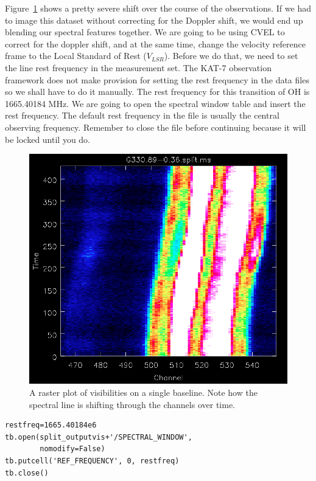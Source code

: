 \documentclass[force,almostfull,justified]{tufte-book}
\begin{document}

Figure~\ref{fig:doppler} shows a pretty severe shift over the course of the observations.  If we had
to image this dataset without correcting for the Doppler shift, we would end up blending our spectral
features together. We are going to be using CVEL to correct for the doppler shift, and at the same
time, change the velocity reference frame to the Local Standard of Rest ($V_{LSR}$).  Before we do
that, we need to set the line rest frequency in the measurement set.  The KAT-7 observation framework
does not make provision for setting the rest frequency in the data files so we shall have to do it
manually.  The rest frequency for this transition of OH is 1665.40184 MHz. We are going to open the
spectral window table and insert the rest frequency.  The default rest frequency in the file is
usually the central observing frequency.  Remember to close the file before continuing because it will
be locked until you do.

\begin{figure}
  \includegraphics[width=\textwidth]{images/doppler_shift}
  \caption[]{A raster plot of visibilities on a single baseline. Note
how the spectral line is shifting through the channels over time.}
  \forceversofloat
  \label{fig:doppler}
\end{figure}

\begin{casacmd}
\begin{verbatim}
restfreq=1665.40184e6
tb.open(split_outputvis+'/SPECTRAL_WINDOW',
        nomodify=False)
tb.putcell('REF_FREQUENCY', 0, restfreq)
tb.close()
\end{verbatim}
\end{casacmd}
\end{document}
